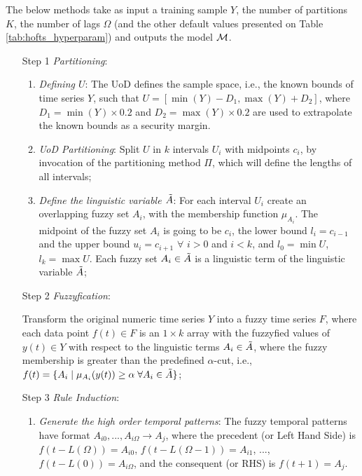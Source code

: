 The below methods take as input a training sample $Y$, the number of partitions $K$, the number of lags $\Omega$ (and the other default values presented on Table \ref{tab:hofts_hyperparam}) and outputs the model $\mathcal{M}$.

\begin{enumerate}
\item[Step 1] \textit{Partitioning}:
\begin{enumerate}
\item \textit{Defining $U$}: The UoD defines the sample space, i.e., the known bounds of time series $Y$, such that $U = [\min(Y)-D_1, \max(Y)+D_2]$, where $D_1 = \min(Y)\times 0.2$ and $D_2 = \max(Y)\times 0.2$ are used to extrapolate the known bounds as a security margin. 

\item \textit{UoD Partitioning}: Split $U$ in $k$ intervals $U_i$ with midpoints $c_i$, by invocation of the partitioning method $\Pi$, which will define the lengths of all intervals;

\item \textit{Define the linguistic variable $\Tilde{A}$}: For each interval $U_i$ create an overlapping fuzzy set $A_i$, with the membership function $\mu_{A_i}$. The midpoint of the fuzzy set $A_i$ is going to be $c_i$, the lower bound $l_i = c_{i-1}$ and the upper bound $u_i = c_{i+1}$ $\forall$ $i >0$ and $i < k$, and $l_0 = \min U$, $l_k = \max U$. Each fuzzy set $A_i \in \Tilde{A}$ is a linguistic term of the linguistic variable $\Tilde{A}$;
\end{enumerate}

\item[Step 2] \textit{Fuzzyfication}: 

Transform the original numeric time series $Y$ into a fuzzy time series $F$, where each data point $f(t) \in F$ is an $1\times k$ array with the fuzzyfied values of $y(t) \in Y$ with respect to the linguistic terms $A_i \in \Tilde{A}$, where the fuzzy membership is greater than the predefined $\alpha$-cut, i.e., $f(t) = \{A_i\; |\; \mu_{A_i}(y(t)) \geq \alpha\;\forall A_i \in \Tilde{A}\}$;

\item[Step 3] \textit{Rule Induction}: 
\begin{enumerate}
\item \textit{Generate the high order temporal patterns}: The fuzzy temporal patterns have format $A_{i0},...,A_{i\Omega} \rightarrow A_j$, where the precedent (or Left Hand Side) is $f(t - L(\Omega)) = A_{i0}$, $f(t - L(\Omega-1)) = A_{i1}$, ..., $f(t - L(0)) = A_{i\Omega}$, and the consequent (or RHS) is $f(t+1) = A_j$.


\end{enumerate}
\end{enumerate}
